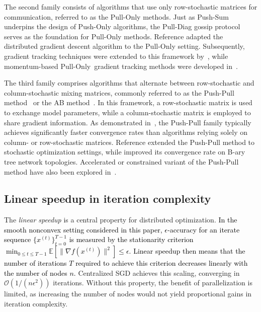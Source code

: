 \documentclass[10pt]{article}
\newcommand{\EE}{\mathbb{E}}
\newcommand{\pushsum}{{\sc Push-Sum}\xspace}
\newcommand{\pushonly}{{\sc Push-Only}\xspace}
\newcommand{\pushpull}{{\sc Push-Pull}\xspace}
\newcommand{\pullonly}{{\sc Pull-Only}\xspace}
\newcommand{\ab}{{\sc AB}\xspace}
\newcommand{\norm}[1]{\| #1 \|}
\newcommand{\pulldiag}{{\sc Pull-Diag}\xspace}
\newcommand{\revision}[1]{\textcolor{black}{#1}}
\begin{document}
The second family consists of algorithms that use only row-stochastic matrices for communication, referred to as the \pullonly methods. Just as \pushsum underpins the design of \pushonly algorithms, the \pulldiag gossip protocol~\cite{mai2016distributed} serves as the foundation for \pullonly methods. Reference \cite{mai2016distributed} adapted the distributed gradient descent algorithm to the \pullonly setting. Subsequently, gradient tracking techniques were extended to this framework by~\cite{li2019row, FROST-Xinran}, while momentum-based \pullonly\ gradient tracking methods were developed in~\cite{ghaderyan2023fast, lu2020nesterov}.

The third family comprises algorithms that alternate between row-stochastic and column-stochastic mixing matrices, commonly referred to as the \pushpull method~\cite{pu2020push} or the \ab method~\cite{xin2018linear}. In this framework, a row-stochastic matrix is used to exchange model parameters, while a column-stochastic matrix is employed to share gradient information. As demonstrated in~\cite{xin2018linear, pu2020push, nedic2023ab}, the \pushpull family typically achieves significantly faster convergence rates than algorithms relying solely on column- or row-stochastic matrices. Reference \cite{xin2019SAB,zhao2023asymptotic} extended the \pushpull method to stochastic optimization settings, while \cite{you2024bary} improved its convergence rate on B-ary tree network topologies. Accelerated or constrained variant of the \pushpull method have also been explored in~\cite{nguyen2023accelerated, gong2023push}.


\subsection{Linear speedup in iteration complexity} The \emph{linear speedup} is a central property for distributed optimization. \revision{In the smooth nonconvex setting considered in this paper, $\epsilon$-accuracy for an iterate sequence $\{x^{(t)}\}_{t=0}^{T-1}$ is measured by the stationarity criterion $\min_{0\le t\le T-1}\EE[\norm{\nabla f(x^{(t)})}^2]\le \epsilon$. Linear speedup then means that the number of iterations $T$ required to achieve this criterion decreases linearly with the number of nodes $n$.} Centralized SGD achieves this scaling, converging in $\mathcal{O}(1/(n\epsilon^2))$ iterations. Without this property, the benefit of parallelization is limited, as increasing the number of nodes would not yield proportional gains in iteration complexity.  
\end{document}
